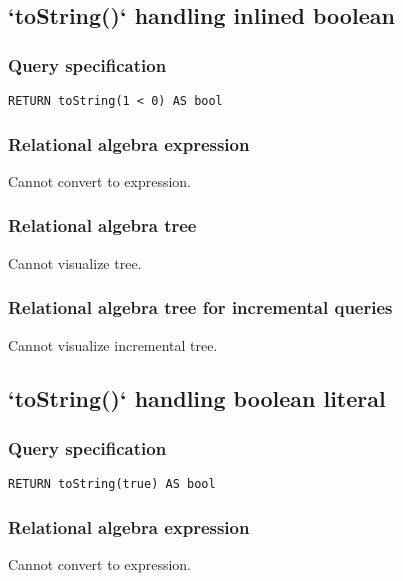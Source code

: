 \subsection{`toString()` handling inlined boolean}

\subsubsection*{Query specification}

\begin{lstlisting}
RETURN toString(1 < 0) AS bool
\end{lstlisting}

\subsubsection*{Relational algebra expression}

Cannot convert to expression.

\subsubsection*{Relational algebra tree}

Cannot visualize tree.

\subsubsection*{Relational algebra tree for incremental queries}

Cannot visualize incremental tree.

\subsection{`toString()` handling boolean literal}

\subsubsection*{Query specification}

\begin{lstlisting}
RETURN toString(true) AS bool
\end{lstlisting}

\subsubsection*{Relational algebra expression}

Cannot convert to expression.


